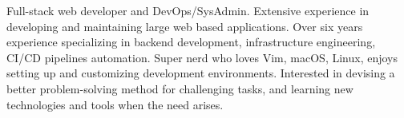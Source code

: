 

\begin{cvparagraph}
Full-stack web developer and DevOps/SysAdmin.
Extensive experience in developing and maintaining large web based applications.
Over six years experience specializing in backend development, infrastructure engineering, CI/CD pipelines automation.
Super nerd who loves Vim, macOS, Linux, enjoys setting up and customizing development environments.
Interested in devising a better problem-solving method for challenging tasks, and learning new technologies and tools when the need arises.
\end{cvparagraph}
